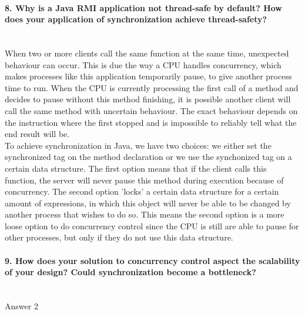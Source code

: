 \documentclass{ds-report}
\begin{document}
	\paragraph{8. Why is a Java RMI application not thread-safe by default? How does your application of synchronization achieve thread-safety?} \mbox{}\\
When two or more clients call the same function at the same time, unexpected behaviour can occur. This is due the way a CPU handles concurrency, which makes processes like this application temporarily pause, to give another process time to run. When the CPU is currently processing the first call of a method and decides to pause without this method finishing, it is possible another client will call the same method with uncertain behaviour. The exact behaviour depends on the instruction where the first stopped and is impossible to reliably tell what the end result will be.\\
To achieve synchronization in Java, we have two choices: we either set the synchronized tag on the method declaration or we use the synchonized tag on a certain data structure. The first option means that if the client calls this function, the server will never pause this method during execution because of concurrency. The second option 'locks' a certain data structure for a certain amount of expressions, in which this object will never be able to be changed by another process that wishes to do so. This means the second option is a more loose option to do concurrency control since the CPU is still are able to pause for other processes, but only if they do not use this data structure.

	\paragraph{9. How does your solution to concurrency control aspect the scalability of your design? Could
synchronization become a bottleneck?} \mbox{}\\
	Answer 2

	
	\clearpage
	
	
\end{document}

